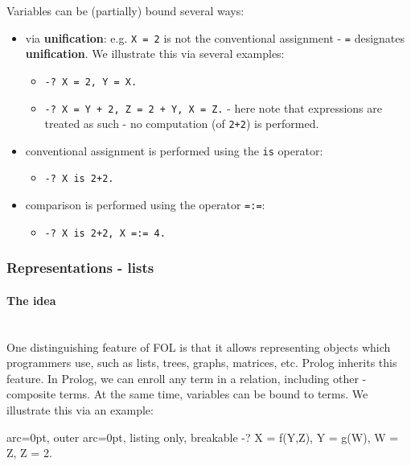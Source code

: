 Variables can be (partially) bound several ways:
\begin{itemize}
	\item  via \textbf{unification}: e.g. \texttt{X = 2} is not the conventional assignment - \texttt{=} designates \textbf{unification}. We illustrate this via several examples:

  \begin{itemize}
  	\item  \texttt{-? X = 2, Y = X.}
  	\item  \texttt{-? X = Y + 2, Z = 2 + Y, X = Z.} - here note that expressions are treated as such - no computation (of \texttt{2+2}) is performed.
  \end{itemize}
	\item  conventional assignment is performed using the \texttt{is} operator:

  \begin{itemize}
  	\item  \texttt{-? X is 2+2.}
  \end{itemize}
	\item  comparison is performed using the operator \texttt{=:=}:

  \begin{itemize}
  	\item  \texttt{-? X is 2+2, X =:= 4.}
  \end{itemize}
\end{itemize}

\subsubsection*{ Representations - lists }

\paragraph{ The idea }\hfill\\

One distinguishing feature of FOL is that it allows representing objects which programmers use, such as lists, trees, graphs, matrices, etc. Prolog inherits this feature. In Prolog, we can enroll any term in a relation, including other - composite terms. At the same time, variables can be bound to terms. We illustrate this via an example:


\begin{tcblisting}{ arc=0pt, outer arc=0pt, listing only, breakable}
-? X = f(Y,Z), Y = g(W), W = Z, Z = 2.

\end{tcblisting}


